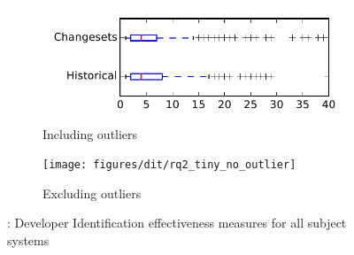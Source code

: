 
\begin{figure}
    \centering
    \begin{subfigure}{.4\textwidth}
        \centering
        \includegraphics[height=0.4\textheight]{figures/dit/rq2_tiny}
        \caption{Including outliers}\label{fig:dit:rq2:tiny_outlier}
    \end{subfigure}%
    \begin{subfigure}{.4\textwidth}
        \centering
        \texttt{[image: figures/dit/rq2\_tiny\_no\_outlier]}
        \caption{Excluding outliers}\label{fig:dit:rq2:tiny_no_outlier}
    \end{subfigure}
\caption{\dtwo: Developer Identification effectiveness measures for all subject systems}
\label{fig:dit:rq2:tiny}
\end{figure}
